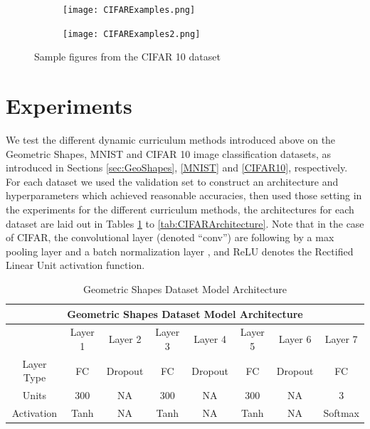 \begin{figure}[h!]
\hspace*{-2cm}    
\centering
\begin{subfigure}{.6\textwidth}
  \centering
  \texttt{[image: CIFARExamples.png]}
\end{subfigure}%
\begin{subfigure}{.6\textwidth}
  \centering
  \texttt{[image: CIFARExamples2.png]}
\end{subfigure}
\caption{Sample figures from the CIFAR 10 dataset}
\label{fig:CIFARSamples}
\end{figure}



\section{Experiments}
We test the different dynamic curriculum methods introduced above on the Geometric Shapes, MNIST and CIFAR 10 image classification datasets, as introduced in Sections \ref{sec:GeoShapes}, \ref{MNIST} and \ref{CIFAR10}, respectively. For each dataset we used the validation set to construct an architecture and hyperparameters which achieved reasonable accuracies, then used those setting in the experiments for the different curriculum methods, the architectures for each dataset are laid out in Tables \ref{tab:GeoArchitecture2} to \ref{tab:CIFARArchitecture}. Note that in the case of CIFAR, the convolutional layer (denoted ``conv'') are following by a max pooling layer \cite{nagi2011max} and a batch normalization layer \cite{ioffe2015batch}, and ReLU denotes the Rectified Linear Unit activation function\cite{nair2010rectified}. 

\begin{table}[h!]
\caption{Geometric Shapes Dataset Model Architecture} \label{tab:GeoArchitecture2}
\begin{tabular}{|c||c|c|c|c|c|c|c|}
\hline
\multicolumn{8}{|c|}{Geometric Shapes Dataset Model Architecture} \\
\hline
 & Layer 1 & Layer 2 & Layer 3& Layer 4 &Layer 5 & Layer 6 & Layer 7 \\
\hline
\hline
Layer Type & FC & Dropout & FC & Dropout & FC & Dropout  & FC \\
\hline
Units & 300 & NA & 300 & NA & 300 & NA & 3 \\
\hline
Activation & Tanh & NA & Tanh & NA & Tanh & NA & Softmax \\
\hline
\end{tabular}
\end{table}

